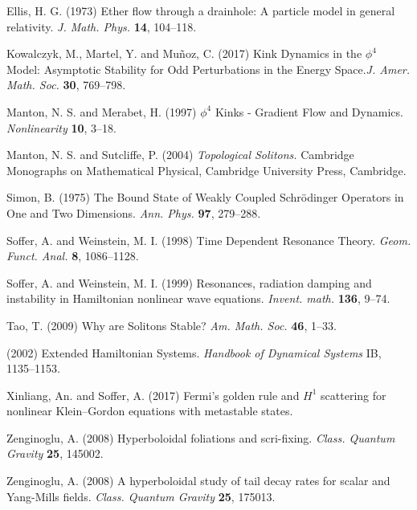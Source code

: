 \begin{thebibliography}{}
 Ellis, H. G. (1973)
Ether flow through a drainhole: A particle model in general relativity. \textit{J. Math. Phys.} {\bf 14}, 104--118.


 Kowalczyk, M., Martel, Y. and Mu\~noz, C. (2017)
Kink Dynamics in the $\phi^4$ Model: Asymptotic Stability for Odd Perturbations in the Energy Space.\textit{J. Amer. Math. Soc.} {\bf 30}, 769--798.

 Manton, N. S. and Merabet, H. (1997)
$\phi^4$ Kinks - Gradient Flow and Dynamics. \textit{Nonlinearity} {\bf 10}, 3--18.

 Manton, N. S. and Sutcliffe, P. (2004)
\textit{Topological Solitons.} Cambridge Monographs on Mathematical Physical, Cambridge University Press, Cambridge.

 Simon, B. (1975)
The Bound State of Weakly Coupled Schr\"odinger Operators in One and Two Dimensions. \textit{Ann. Phys.} {\bf 97}, 279--288.


 Soffer, A. and Weinstein, M. I. (1998)
Time Dependent Resonance Theory. \textit{Geom. Funct. Anal.} {\bf 8}, 1086--1128.

 Soffer, A. and Weinstein, M. I. (1999)
Resonances, radiation damping and instability in Hamiltonian nonlinear wave equations. \textit{Invent. math.} {\bf 136}, 9--74.

 Tao, T. (2009)
Why are Solitons Stable? \textit{Am. Math. Soc.} {\bf 46}, 1--33.

 (2002)
Extended Hamiltonian Systems. \textit{Handbook of Dynamical Systems} IB, 1135--1153.

 Xinliang, An. and Soffer, A. (2017)
Fermi's golden rule and $H^1$ scattering for nonlinear Klein--Gordon equations with metastable states.

 Zenginoglu, A. (2008)
Hyperboloidal foliations and scri-fixing. \textit{Class. Quantum Gravity} {\bf 25}, 145002.

 Zenginoglu, A. (2008)
A hyperboloidal study of tail decay rates for scalar and Yang-Mills fields. \textit{Class. Quantum Gravity} {\bf 25}, 175013.





\end{thebibliography}